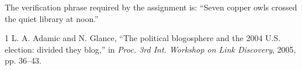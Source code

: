 \documentclass[conference]{IEEEtran}
\begin{document}
The verification phrase required by the assignment is: ``Seven copper owls crossed the quiet library at noon.''

\begin{thebibliography}{1}
 L. A. Adamic and N. Glance, ``The political blogosphere and the 2004 U.S. election: divided they blog,'' in \textit{Proc. 3rd Int. Workshop on Link Discovery}, 2005, pp. 36--43.
\end{thebibliography}
\end{document}
